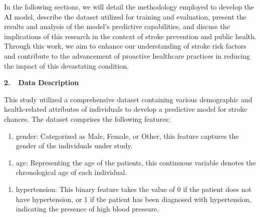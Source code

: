 \documentclass[letterpaper]{article}
\newcounter{saveenum}
\newcommand\liststyleWWNumi{%
\renewcommand\theenumi{\arabic{enumi}}
\renewcommand\theenumii{\arabic{enumii}}
\renewcommand\theenumiii{\arabic{enumiii}}
\renewcommand\theenumiv{\arabic{enumiv}}
\renewcommand\labelenumi{\theenumi.}
\renewcommand\labelenumii{\theenumii.}
\renewcommand\labelenumiii{\theenumiii.}
\renewcommand\labelenumiv{\theenumiv.}
}
\begin{document}
\bigskip

{
In the following sections, we will detail the methodology employed to develop the AI model, describe the dataset
utilized for training and evaluation, present the results and analysis of the model's predictive capabilities, and
discuss the implications of this research in the context of stroke prevention and public health. Through this work, we
aim to enhance our understanding of stroke risk factors and contribute to the advancement of proactive healthcare
practices in reducing the impact of this devastating condition.}


\bigskip


\bigskip

{
\textbf{2.\ \ Data Description}}


\bigskip

{
This study utilized a comprehensive dataset containing various demographic and health-related attributes of individuals
to develop a predictive model for stroke chances. The dataset comprises the following features:}


\bigskip

\liststyleWWNumi
\begin{enumerate}
\item {
gender: Categorized as {\textquotedbl}Male,{\textquotedbl} {\textquotedbl}Female,{\textquotedbl} or
{\textquotedbl}Other,{\textquotedbl} this feature captures the gender of the individuals under study.}
\end{enumerate}

\bigskip

\liststyleWWNumi
\setcounter{saveenum}{\value{enumi}}
\begin{enumerate}
\setcounter{enumi}{\value{saveenum}}
\item {
age: Representing the age of the patients, this continuous variable denotes the chronological age of each individual.}
\end{enumerate}

\bigskip

\liststyleWWNumi
\setcounter{saveenum}{\value{enumi}}
\begin{enumerate}
\setcounter{enumi}{\value{saveenum}}
\item {
hypertension: This binary feature takes the value of 0 if the patient does not have hypertension, or 1 if the patient
has been diagnosed with hypertension, indicating the presence of high blood pressure.}
\end{enumerate}
\end{document}
